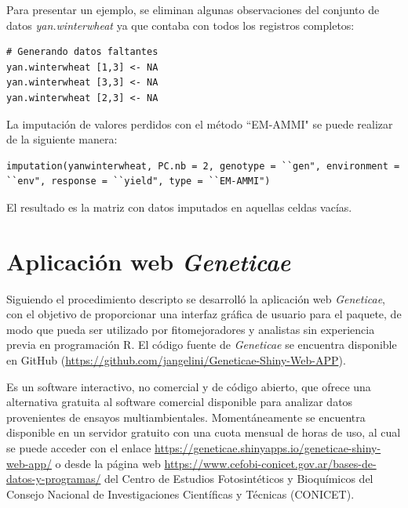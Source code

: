Para presentar un ejemplo, se eliminan algunas observaciones del conjunto de datos \emph{yan.winterwheat} ya que contaba con todos los registros completos:

\begin{tcolorbox}[skin=bicolor,
    colframe=aurometalsaurus,colback=backcolour,colbacklower=white,
    width=1\linewidth,
    height=0.15\linewidth,
    boxsep=-3mm]
\begin{lstlisting}
# Generando datos faltantes
yan.winterwheat [1,3] <- NA
yan.winterwheat [3,3] <- NA
yan.winterwheat [2,3] <- NA
\end{lstlisting}
\end{tcolorbox}

La imputación de valores perdidos con el método ``EM-AMMI" se puede realizar de la siguiente manera:

\begin{tcolorbox}[skin=bicolor,
    colframe=aurometalsaurus,colback=backcolour,colbacklower=white,
    width=1\linewidth,
    height=0.08\linewidth,
    boxsep=-3mm]
\begin{lstlisting}
imputation(yanwinterwheat, PC.nb = 2, genotype = ``gen", environment = ``env", response = ``yield", type = ``EM-AMMI")
\end{lstlisting}
\end{tcolorbox}

El resultado es la matriz con datos imputados en aquellas celdas vacías. 

\section{Aplicación web \emph{Geneticae}}

Siguiendo el procedimiento descripto se desarrolló la aplicación web \emph{Geneticae}, con el objetivo de proporcionar una interfaz gráfica de usuario para el paquete, de modo que pueda ser utilizado por fitomejoradores y analistas sin experiencia previa en programación R. El código fuente de \emph{Geneticae} se encuentra disponible en GitHub (\url{https://github.com/jangelini/Geneticae-Shiny-Web-APP}). 

Es un software interactivo, no comercial y de código abierto, que ofrece una alternativa gratuita al software comercial disponible para analizar datos provenientes de ensayos multiambientales. Momentáneamente se encuentra disponible en un servidor gratuito con una cuota mensual de horas de uso, al cual se puede acceder con el enlace \url{https://geneticae.shinyapps.io/geneticae-shiny-web-app/} o desde la página web \url{https://www.cefobi-conicet.gov.ar/bases-de-datos-y-programas/} del Centro de Estudios Fotosintéticos y Bioquímicos del Consejo Nacional de Investigaciones Científicas y Técnicas (CONICET).

